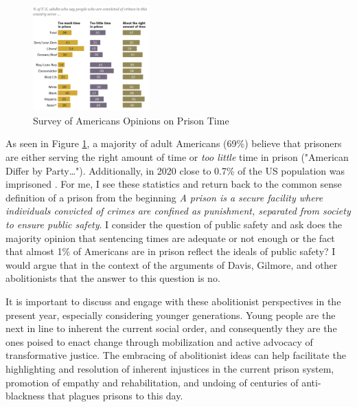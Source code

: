 \begin{figure}
	\centering
	\includegraphics[width=0.4\textwidth]{figures/pewpoll.png}
	\caption{Survey of Americans Opinions on Prison Time}
	\label{fig:pewpoll}
\end{figure}
As seen in Figure \ref{fig:pewpoll}, a majority of adult Americans (69\%) believe that prisoners are either serving the right amount of time or \textit{too little} time in prison \nocite{AmericansDifferParty}("American Differ by Party\ldots").
Additionally, in 2020 close to 0.7\% of the US population was imprisoned \cite{peterwagnerWhatPercentIncarcerated}. For me, I see these statistics and return back to the common sense definition of a prison from the beginning \textit{A prison is a secure facility where individuals convicted of crimes are confined as punishment, separated from society to ensure public safety}. I consider the question of public safety and ask does the majority opinion that sentencing times are adequate or not enough or the fact that almost 1\% of Americans are in prison reflect the ideals of public safety? I would argue that in the context of the arguments of Davis, Gilmore, and other abolitionists that the answer to this question is no. 

It is important to discuss and engage with these abolitionist perspectives in the present year, especially considering younger generations. Young people are the next in line to inherent the current social order, and consequently they are the ones poised to enact change through mobilization and active advocacy of transformative justice. The embracing of abolitionist ideas can help facilitate the highlighting and resolution of inherent injustices in the current prison system, promotion of empathy and rehabilitation, and undoing of centuries of anti-blackness that plagues prisons to this day.
